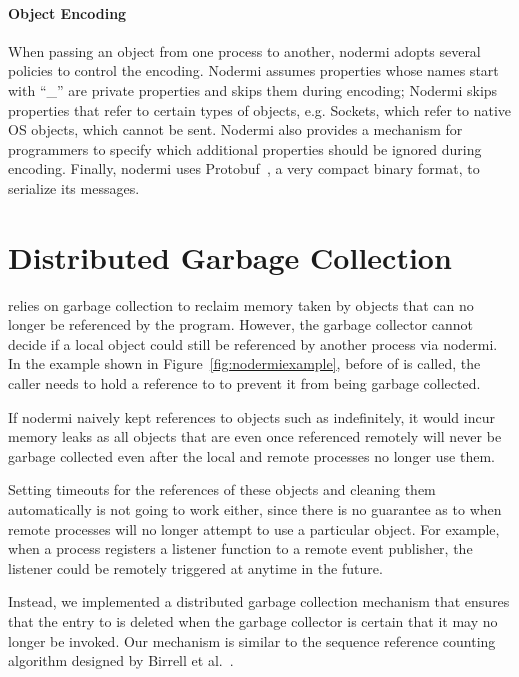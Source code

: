 \paragraph{Object Encoding}
When passing an object from one process to another,
nodermi adopts several policies to control the encoding.
Nodermi assumes properties whose names start with ``\_'' are
private properties and skips them during encoding;
Nodermi skips properties that refer to certain types of objects, e.g. Sockets,
which refer to native OS objects, which cannot be sent.
Nodermi also provides a mechanism for programmers to specify which
additional properties should be ignored during encoding.
Finally, nodermi uses Protobuf~\cite{protobuf}, a very compact
binary format, to serialize its messages.


\section{Distributed Garbage Collection}
\js{} relies on garbage collection to reclaim memory taken by
objects that can no longer be referenced by the program.
However, the garbage collector cannot decide if a local object
could still be referenced by another process via nodermi.
In the example shown in Figure~\ref{fig:nodermiexample},
before  of  is called,
the caller needs to hold a reference to 
to prevent it from being garbage collected.

If nodermi naively kept references to objects such as
 indefinitely, it would incur memory leaks as all
objects that are even once referenced remotely will never be garbage
collected even after the local and remote processes no longer use them.

Setting timeouts for the references of these objects and cleaning
them automatically is not going to work either,
since there is no guarantee as to when remote processes will
no longer attempt to use a particular object.
For example, when a process registers a listener function to a remote event publisher,
the listener could be remotely triggered at anytime in the future.

Instead, we implemented a distributed garbage collection mechanism
that ensures that the entry to  is deleted when the
garbage collector is certain that it may no longer be invoked.
Our mechanism is similar to the sequence reference counting algorithm
designed by Birrell et al.~\cite{birrell1993distributed}.


